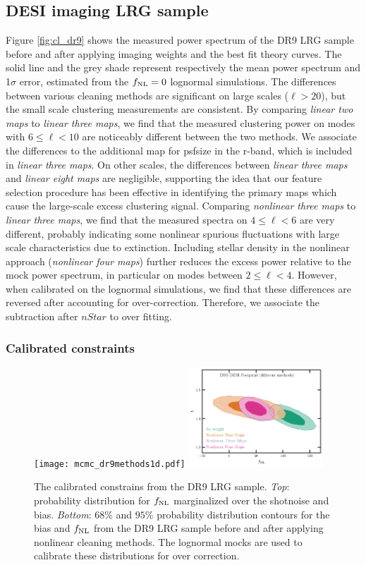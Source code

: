 \subsection{DESI imaging LRG sample}
Figure \ref{fig:cl_dr9} shows the measured power spectrum of the DR9 LRG sample before and after applying imaging weights and the best fit theory curves. The solid line and the grey shade represent respectively the mean power spectrum and 1$\sigma$ error, estimated from the $f_{\rm NL}=0$ lognormal simulations. The differences between various cleaning methods are significant on large scales ($\ell > 20$), but the small scale clustering measurements are consistent. By comparing \textit{linear two maps} to \textit{linear three maps}, we find that the measured clustering power on modes with $6\leq \ell < 10$ are noticeably different between the two methods. We associate the differences to the additional map for psfsize in the r-band, which is included in \textit{linear three maps}. On other scales, the differences between \textit{linear three maps} and \textit{linear eight maps} are negligible, supporting the idea that our feature selection procedure has been effective in identifying the primary maps which cause the large-scale excess clustering signal. Comparing \textit{nonlinear three maps} to \textit{linear three maps}, we find that the measured spectra on $4 \leq \ell < 6$ are very different, probably indicating some nonlinear spurious fluctuations with large scale characteristics due to extinction. Including stellar density in the nonlinear approach (\textit{nonlinear four maps}) further reduces the excess power relative to the mock power spectrum, in particular on modes between $2\leq \ell < 4$. However, when calibrated on the lognormal simulations, we find that these differences are reversed after accounting for over-correction. Therefore, we associate the subtraction after $nStar$ to over fitting.


\subsubsection{Calibrated constraints}

\begin{figure}
    \raggedleft
    \texttt{[image: mcmc\_dr9methods1d.pdf]}
    \includegraphics[width=0.45\textwidth]{figures/mcmc_dr9methods.pdf} 
    \caption{The calibrated constrains from the DR9 LRG sample. \textit{Top}: probability distribution for $f_{\rm NL}$ marginalized over the shotnoise and bias. \textit{Bottom}: $68\%$ and $95\%$ probability distribution contours for the bias and $f_{\rm NL}$ from the DR9 LRG sample before and after applying nonlinear cleaning methods. The lognormal mocks are used to calibrate these distributions for over correction.}\label{fig:mcmc_dr9}
\end{figure}

